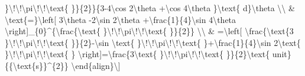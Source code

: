 \}\textbackslash !\textbackslash !\textbackslash pi\textbackslash !\textbackslash !\textbackslash text\{
\}\}\{2\}\}\{3-4\textbackslash cos 2\textbackslash theta +\textbackslash cos
4\textbackslash theta \}\textbackslash text\{ d\}\textbackslash theta
\textbackslash\textbackslash{} \& \textbackslash text\{=\}\textbackslash left{[}
3\textbackslash theta -2\textbackslash sin 2\textbackslash theta
+\textbackslash frac\{1\}\{4\}\textbackslash sin 4\textbackslash theta
\textbackslash right{]}\_\{0\}\textasciicircum\{\textbackslash frac\{\textbackslash text\{
\}\textbackslash !\textbackslash !\textbackslash pi\textbackslash !\textbackslash !\textbackslash text\{
\}\}\{2\}\} \textbackslash\textbackslash{} \& =\textbackslash left{[}
\textbackslash frac\{\textbackslash text\{3 \}\textbackslash !\textbackslash !\textbackslash pi\textbackslash !\textbackslash !\textbackslash text\{
\}\}\{2\}-\textbackslash sin \textbackslash text\{ \}\textbackslash !\textbackslash !\textbackslash pi\textbackslash !\textbackslash !\textbackslash text\{
\}+\textbackslash frac\{1\}\{4\}\textbackslash sin 2\textbackslash text\{
\}\textbackslash !\textbackslash !\textbackslash pi\textbackslash !\textbackslash !\textbackslash text\{
\} \textbackslash right{]}=\textbackslash frac\{3\textbackslash text\{
\}\textbackslash !\textbackslash !\textbackslash pi\textbackslash !\textbackslash !\textbackslash text\{
\}\}\{2\}\textbackslash text\{ unit\}\{\{\textbackslash text\{s\}\}\textasciicircum\{2\}\}
\textbackslash end\{align\}\textbackslash{]} 

